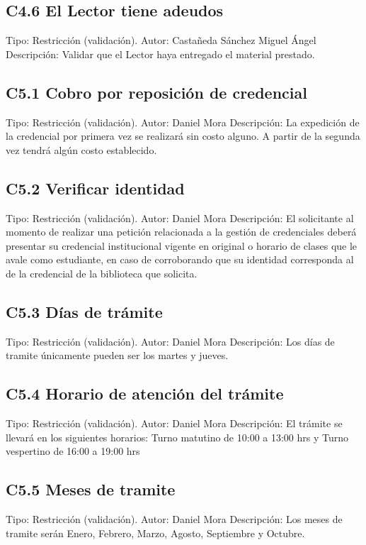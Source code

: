  \subsection{C4.6 El Lector tiene adeudos}
	\UCli Tipo: Restricción (validación).
	\UCli Autor: Castañeda Sánchez Miguel Ángel
	\UCli Descripción: Validar que el Lector haya entregado el material prestado.

\subsection{C5.1 Cobro por reposición de credencial}
	\UCli Tipo: Restricción (validación).
	\UCli Autor: Daniel Mora
	\UCli Descripción: La expedición de la credencial por primera vez se realizará sin costo alguno. A partir de la segunda vez tendrá algún costo establecido. 

\subsection{C5.2 Verificar identidad}
	\UCli Tipo: Restricción (validación).
	\UCli Autor: Daniel Mora
	\UCli Descripción: El solicitante al momento de realizar una petición relacionada a la gestión de credenciales deberá presentar su credencial institucional vigente en original o horario de clases que le avale como estudiante, en caso de  corroborando que su identidad corresponda al de la credencial de la biblioteca que solicita. 
	
\subsection{C5.3 Días de trámite}
	\UCli Tipo: Restricción (validación).
	\UCli Autor: Daniel Mora
	\UCli Descripción: Los días de tramite únicamente pueden ser los martes y jueves.
	
\subsection{C5.4 Horario de atención del trámite}
	\UCli Tipo: Restricción (validación).
	\UCli Autor: Daniel Mora
	\UCli Descripción: El trámite se llevará en los siguientes horarios: Turno matutino de 10:00 a 13:00 hrs y Turno vespertino de 16:00 a 19:00 hrs
	
\subsection{C5.5 Meses de tramite}
	\UCli Tipo: Restricción (validación).
	\UCli Autor: Daniel Mora
	\UCli Descripción: Los meses de tramite serán Enero, Febrero, Marzo, Agosto, Septiembre y Octubre. 
